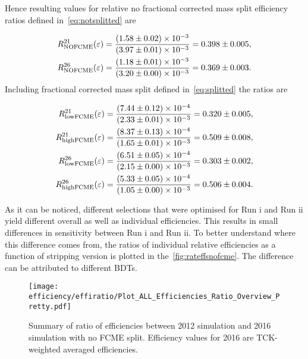 Hence resulting values for relative no fractional corrected mass split efficiency ratios defined in~\autoref{eq:notsplitted} are

\begin{equation}
\begin{aligned}
	R^{21}_{\rm{NOFCME}}(\varepsilon)=\frac{(1.58\pm0.02)\times 10 ^{-3 }}{(3.97\pm0.01)\times 10 ^{-3 }}=0.398\pm0.005,\\
	R^{26}_{\rm{NOFCME}}(\varepsilon)=\frac{(1.18\pm0.01)\times 10 ^{-3 }}{(3.20\pm0.00)\times 10 ^{-3 }}=0.369\pm0.003.
\end{aligned}
\label{eq:nofcmeer}
\end{equation}
Including fractional corrected mass split defined in~\autoref{eq:splitted} the ratios are

\begin{equation}
\begin{aligned}
	R^{21}_{\rm{lowFCME}}(\varepsilon)=\frac{(7.44\pm0.12)\times 10 ^{-4 }}{(2.33\pm0.01)\times 10 ^{-3 }}= 0.320\pm0.005,\\
	R^{21}_{\rm{highFCME}}(\varepsilon)=\frac{(8.37\pm0.13)\times 10 ^{-4 }}{(1.65\pm0.01)\times 10 ^{-3 }}=0.509\pm0.008,\\
	R^{26}_{\rm{lowFCME}}(\varepsilon)=\frac{(6.51\pm0.05)\times 10 ^{-4 }}{(2.15\pm0.00)\times 10 ^{-3 }}=0.303\pm0.002,\\
	R^{26}_{\rm{highFCME}}(\varepsilon)=\frac{(5.33\pm0.05)\times 10 ^{-4 }}{(1.05\pm0.00)\times 10 ^{-3 }}=0.506\pm0.004.
\end{aligned}
\label{eq:allfcmeer}
\end{equation}
	
	
As it can be noticed, different selections that were optimised for Run \Rn{1} and Run \Rn{2} yield different overall as well as individual efficiencies. This results in small differences in sensitivity between Run \Rn{1} and Run \Rn{2}. To better understand where this difference comes from, the ratios of individual relative efficiencies as a function of stripping version is plotted in the~\autoref{fig:rateffsnofcme}. The difference can be attributed to different BDTs.

\begin{figure}[H]
\centering
\texttt{[image: efficiency/effiratio/Plot\_ALL\_Efficiencies\_Ratio\_Overview\_Pretty.pdf]}
\caption{Summary of ratio of efficiencies between 2012 simulation and 2016 simulation with no FCME split. Efficiency values for 2016 are TCK-weighted averaged efficiencies.}
\centering
\label{fig:rateffsnofcme}
\end{figure}

